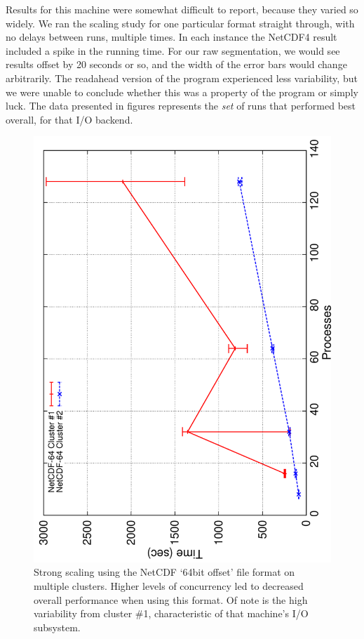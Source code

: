 Results for this machine were somewhat difficult to report, because
they varied so widely.  We ran the scaling study for one particular
format straight through, with no delays between runs, multiple
times.  In each instance the NetCDF4 result included a spike in the
running time.  For our raw segmentation, we would see results offset
by 20 seconds or so, and the width of the error bars would change
arbitrarily.  The readahead version of the program experienced less
variability, but we were unable to conclude whether this was a property
of the program or simply luck.  The data presented in figures
represents the \emph{set} of runs that performed best overall, for
that I/O backend.

\begin{figure}
  \centering
  \includegraphics[angle=270,width=\linewidth]{images/io/n64}
  \caption{Strong scaling using the NetCDF `64bit offset' file format
  on multiple clusters.  Higher levels of concurrency led to decreased
  overall performance when using this format.  Of note is the high
  variability from cluster \#1, characteristic of that machine's I/O
  subsystem.}
  \label{fig:n64}
\end{figure}


